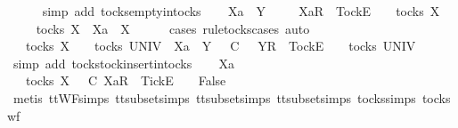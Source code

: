 \ \ \ \ \isamarkupfalse%
\ {\isacharparenleft}simp\ add{\isacharcolon}\ tocks{\isachardot}empty{\isacharunderscore}in{\isacharunderscore}tocks{\isacharparenright}\isanewline
{}\isamarkupfalse%
\isanewline
\ \ \isamarkupfalse%
\ Xa\ {\isasymrho}\ Y\ {\isasymsigma}\isanewline
\ \ \isamarkupfalse%
\ {\isachardoublequoteopen}{\isacharbrackleft}Xa{\isacharbrackright}\isactrlsub R\ {\isacharhash}\ {\isacharbrackleft}Tock{\isacharbrackright}\isactrlsub E\ {\isacharhash}\ {\isasymrho}\ {\isasymin}\ tocks\ X{\isachardoublequoteclose}\isanewline
\ \ \isamarkupfalse%
\ \isamarkupfalse%
\ {\isachardoublequoteopen}{\isasymrho}\ {\isasymin}\ tocks\ X\ {\isasymand}\ Xa\ {\isasymsubseteq}\ X{\isachardoublequoteclose}\isanewline
\ \ \ \ \isamarkupfalse%
\ {\isacharparenleft}cases\ rule{\isacharcolon}tocks{\isachardot}cases{\isacharcomma}\ auto{\isacharparenright}\isanewline
\ \ \isamarkupfalse%
\ \isamarkupfalse%
\ {\isachardoublequoteopen}{\isacharparenleft}{\isasymrho}\ {\isasymin}\ tocks\ X\ {\isasymLongrightarrow}\ {\isasymsigma}\ {\isasymin}\ tocks\ UNIV{\isacharparenright}\ {\isasymLongrightarrow}\ Xa\ {\isasymsubseteq}\ Y\ {\isasymLongrightarrow}\ {\isasymrho}\ {\isasymsubseteq}\isactrlsub C\ {\isasymsigma}\ {\isasymLongrightarrow}\ {\isacharbrackleft}Y{\isacharbrackright}\isactrlsub R\ {\isacharhash}\ {\isacharbrackleft}Tock{\isacharbrackright}\isactrlsub E\ {\isacharhash}\ {\isasymsigma}\ {\isasymin}\ tocks\ UNIV{\isachardoublequoteclose}\isanewline
\ \ \ \ \isamarkupfalse%
\ {\isacharparenleft}simp\ add{\isacharcolon}\ tocks{\isachardot}tock{\isacharunderscore}insert{\isacharunderscore}in{\isacharunderscore}tocks{\isacharparenright}\isanewline
{}\isamarkupfalse%
\isanewline
\ \ \isamarkupfalse%
\ Xa\ {\isasymrho}\ {\isasymsigma}\isanewline
\ \ \isamarkupfalse%
\ {\isachardoublequoteopen}{\isasymrho}\ {\isasymin}\ tocks\ X\ {\isasymLongrightarrow}\ {\isasymrho}\ {\isasymsubseteq}\isactrlsub C\ {\isacharbrackleft}Xa{\isacharbrackright}\isactrlsub R\ {\isacharhash}\ {\isacharbrackleft}Tick{\isacharbrackright}\isactrlsub E\ {\isacharhash}\ {\isasymsigma}\ {\isasymLongrightarrow}\ False{\isachardoublequoteclose}\isanewline
\ \ \ \ \isamarkupfalse%
\ {\isacharparenleft}metis\ ttWF{\isachardot}simps{\isacharparenleft}{}{}{\isacharparenright}\ tt{\isacharunderscore}subset{\isachardot}simps{\isacharparenleft}{}{\isacharparenright}\ tt{\isacharunderscore}subset{\isachardot}simps{\isacharparenleft}{}{\isacharparenright}\ tt{\isacharunderscore}subset{\isachardot}simps{\isacharparenleft}{}{\isacharparenright}\ tocks{\isachardot}simps\ tocks{\isacharunderscore}wf{\isacharparenright}\isanewline
